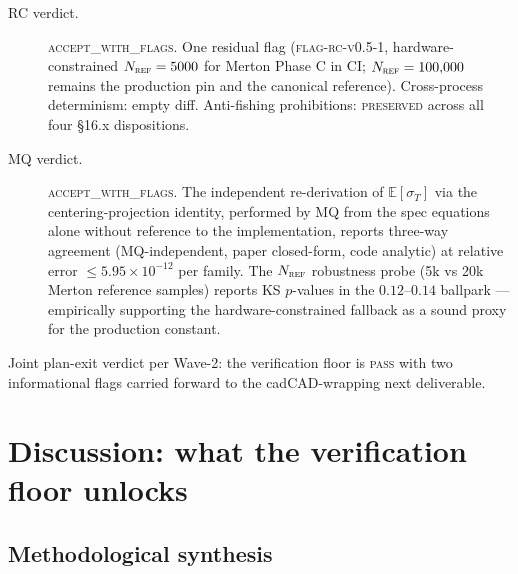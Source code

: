 \documentclass[11pt,letterpaper]{article}
\newcommand{\E}{\mathbb{E}}
\newcommand{\sigmaT}{\sigma_{T}}
\begin{document}
\begin{description}
    \item[RC verdict.] \textsc{accept\_with\_flags}. One residual flag
        (\textsc{flag-rc-v0.5-1}, hardware-constrained
        $N_{\textsc{ref}} = 5000$ for Merton Phase C in CI;
        $N_{\textsc{ref}} = 100{,}000$ remains the production pin and
        the canonical reference). Cross-process determinism: empty
        diff. Anti-fishing prohibitions: \textsc{preserved} across all
        four §16.x dispositions.
    \item[MQ verdict.] \textsc{accept\_with\_flags}. The independent
        re-derivation of $\E[\sigmaT]$ via the centering-projection
        identity, performed by MQ from the spec equations alone
        without reference to the implementation, reports three-way
        agreement (MQ-independent, paper closed-form, code analytic)
        at relative error $\leq 5.95 \times 10^{-12}$ per family.
        The $N_{\textsc{ref}}$ robustness probe (5k vs 20k Merton
        reference samples) reports KS $p$-values in the
        $0.12$--$0.14$ ballpark — empirically supporting the
        hardware-constrained fallback as a sound proxy for the
        production constant.
\end{description}

Joint plan-exit verdict per Wave-2: the verification floor is
\textsc{pass} with two informational flags carried forward to the
cadCAD-wrapping next deliverable.

\section{Discussion: what the verification floor unlocks}
\label{sec:discussion}

\subsection{Methodological synthesis}
\label{sec:discussion:method}
\end{document}
